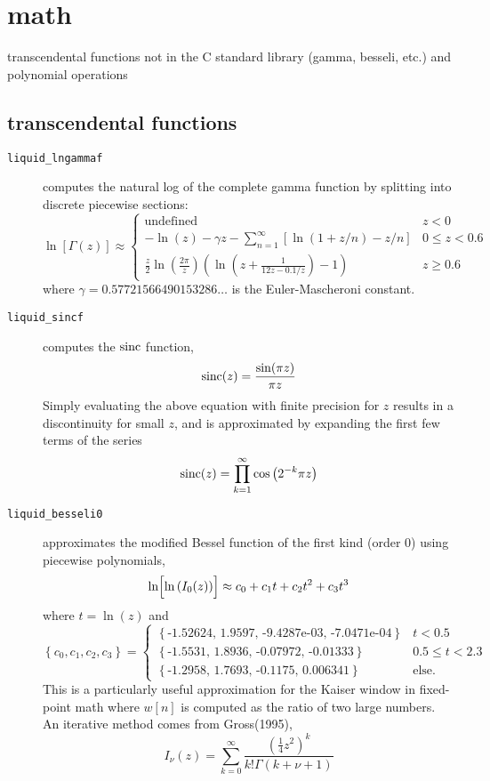 % 
%

\section{math}
\label{module:math}
transcendental functions not in the C standard library (gamma, besseli, etc.)
and polynomial operations

\subsection{transcendental functions}
\label{module:math:transcendentals}

\begin{description}
\item[{\tt liquid\_lngammaf}]
    computes the natural log of the complete gamma function by splitting into
    discrete piecewise sections:
\[
    \ln\left[ \Gamma(z) \right] \approx
    \begin{cases}
        \text{undefined}
        & z < 0 \\
        -\ln(z) - \gamma z - \sum_{n=1}^{\infty} {
            \left[ \ln(1 + z/n) -z/n\right]
        }
        & 0 \le z < 0.6 \\
        \frac{z}{2} \ln\left( \frac{2\pi}{z} \right)
        \left(
            \ln\left(z + \frac{1}{12 z - 0.1/z} \right) - 1
        \right)
        & z \ge 0.6
    \end{cases}
\]
where $\gamma=0.57721566490153286\ldots$ is the Euler-Mascheroni constant.

\item[{\tt liquid\_sincf}]
    computes the $\textup{sinc}$ function,
\[
    \textup{sinc}(z) = \frac{\sin(\pi z)}{\pi z}
\]
Simply evaluating the above equation with finite precision for $z$ results in
a discontinuity for small $z$, and is approximated by expanding the first few
terms of the series
\[
    \textup{sinc}(z) = \prod_{k=1}^{\infty}{ \cos\left( 2^{-k} \pi z \right) }
\]

\item[{\tt liquid\_besseli0}]
    approximates the modified Bessel function of the first kind (order 0)
    using piecewise polynomials,
\[
    \ln\Bigl[\ln\left(I_0(z)\right)\Bigr] \approx
    c_0 + c_1 t + c_2 t ^2 + c_3 t^3
\]
where $t=\ln(z)$ and
\[
    \left\{c_0,c_1,c_2,c_3\right\} =
    \begin{cases}
    \left\{\text{-1.52624, 1.9597, -9.4287e-03, -7.0471e-04}\right\} & t < 0.5 \\
    \left\{\text{-1.5531, 1.8936, -0.07972, -0.01333}\right\} & 0.5 \le t < 2.3 \\
    \left\{\text{-1.2958, 1.7693, -0.1175, 0.006341}\right\} & \text{else}.
    \end{cases}
\]
This is a particularly useful approximation for the Kaiser window in
fixed-point math where $w[n]$ is computed as the ratio of two large numbers.
%
An iterative method comes from Gross(1995),
\[
    I_\nu(z) = \sum_{k=0}^{\infty}{\frac{\left(\frac{1}{4}z^2\right)^k}{k!\Gamma(k+\nu+1)}}
\]


\end{description}
